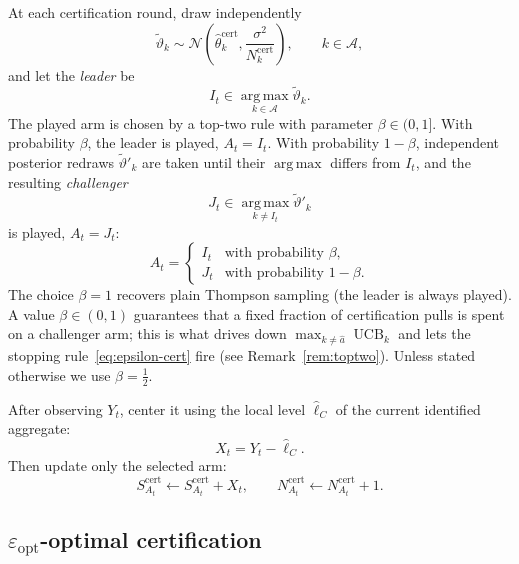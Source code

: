 \documentclass[11pt]{article}
\newcommand{\A}{\mathcal A}
\newcommand{\argmax}{\operatorname*{arg\,max}}
\newcommand{\UCB}{\operatorname{UCB}}
\begin{document}
At each certification round, draw independently
\begin{equation}
    \widetilde\vartheta_k
    \sim
    \mathcal N\!\left(
    \widehat\theta_k^{\mathrm{cert}},
    \frac{\sigma^2}{N_k^{\mathrm{cert}}}
    \right),
    \qquad k\in\A,
\end{equation}
and let the \emph{leader} be
\begin{equation}
    I_t\in\argmax_{k\in\A}\widetilde\vartheta_k.
    \label{eq:ts-leader}
\end{equation}
The played arm is chosen by a top-two rule with parameter $\beta\in(0,1]$. With probability $\beta$, the leader is played, $A_t=I_t$. With probability $1-\beta$, independent posterior redraws $\widetilde\vartheta'_k$ are taken until their $\argmax$ differs from $I_t$, and the resulting \emph{challenger}
\begin{equation}
    J_t\in\argmax_{k\neq I_t}\widetilde\vartheta'_k
\end{equation}
is played, $A_t=J_t$:
\begin{equation}
    A_t=
    \begin{cases}
        I_t & \text{with probability }\beta,\\
        J_t & \text{with probability }1-\beta.
    \end{cases}
    \label{eq:ts-cert-action}
\end{equation}
The choice $\beta=1$ recovers plain Thompson sampling (the leader is always played). A value $\beta\in(0,1)$ guarantees that a fixed fraction of certification pulls is spent on a challenger arm; this is what drives down $\max_{k\neq\widehat a}\UCB_k$ and lets the stopping rule~\eqref{eq:epsilon-cert} fire (see Remark~\ref{rem:toptwo}). Unless stated otherwise we use $\beta=\tfrac12$.

After observing $Y_t$, center it using the local level $\widehat\ell_C$ of the current identified aggregate:
\begin{equation}
    X_t=Y_t-\widehat\ell_C.
\end{equation}
Then update only the selected arm:
\begin{equation}
    S_{A_t}^{\mathrm{cert}}
    \leftarrow
    S_{A_t}^{\mathrm{cert}}+X_t,
    \qquad
    N_{A_t}^{\mathrm{cert}}
    \leftarrow
    N_{A_t}^{\mathrm{cert}}+1.
    \label{eq:cert-online-update}
\end{equation}

\subsection{$\varepsilon_{\mathrm{opt}}$-optimal certification}
\end{document}
